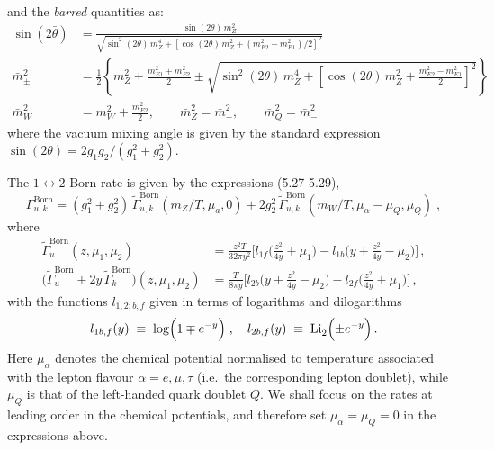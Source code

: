 \documentclass[12pt, a4paper]{article}
\begin{document}
and the \emph{barred} quantities as:
\begin{align}
\sin(2\bar\theta) &= \frac{\sin(2\theta)\, m_Z^2}{\sqrt{\sin^2(2\theta)\, m_Z^4 
  + [\cos(2\theta)\, m_Z^2 + (m_{E2}^2 - m_{E1}^2)/2]^2}} \\
\bar{m}_\pm^2 &= \frac{1}{2}\left\{m_Z^2 + \frac{m_{E1}^2+m_{E2}^2}{2} 
  \pm \sqrt{\sin^2(2\theta)\, m_Z^4 
  + \left[\cos(2\theta)\, m_Z^2 
  + \frac{m_{E2}^2-m_{E1}^2}{2}\right]^2}\right\} \\
\bar{m}_W^2 &= m_W^2 + \frac{m_{E2}^2}{2}, \qquad
\bar{m}_Z^2 = \bar{m}_+^2, \qquad
\bar{m}_Q^2 = \bar{m}_-^2
\end{align}
where the vacuum mixing angle is given by the standard expression
$\sin(2\theta) = 2g_1 g_2/(g_1^2+g_2^2)$.

The $1\leftrightarrow2$ Born rate is given by the expressions (5.27-5.29),
 \begin{equation}
 \Gamma^\mathrm{Born}_{\!u,k}
   =
   (g_1^2 + g_2^2)\,
   \tilde{\Gamma}_{\!u,k}^\mathrm{Born}
   (m_Z/T, \mu_{a}, 0)
   + 
   2 g_2^2\, \tilde{\Gamma}_{\!u,k}^\mathrm{Born}
   (m_W/T, \mu_\alpha - \mu_Q,\mu_Q)
   \;,
 \end{equation}
where
 \begin{align}
 \tilde{\Gamma}^\mathrm{Born}_{\!u}(z,\mu^{ }_1,\mu^{ }_2) 
 &=
 \frac{z^2 T}{32\pi y^2}
 \biggl[
   l_{1f} \biggl( \frac{z^2}{4 y} + \mu^{ }_1 \biggr) 
 - 
 l_{1b} \biggl( y + \frac{z^2}{4y} - \mu^{ }_2 \biggr) 
 \biggr]\,,\\
 \bigl( \tilde{\Gamma}^\mathrm{Born}_{\!u}
 + 2 y\, \tilde{\Gamma}^\mathrm{Born}_{\!k}
 \bigr) (z,\mu^{ }_1,\mu^{ }_2)
 &=
 \frac{T}{8\pi y}
 \biggl[
   l_{2b} \biggl(y+ \frac{z^2}{4 y} - \mu^{ }_2 \biggr) 
 - 
 l_{2f} \biggl( \frac{z^2}{4y} + \mu^{ }_1 \biggr) 
 \biggr]\,,
 \end{align}
with the functions $l_{1,2;b,f}$ given in terms of logarithms and dilogarithms
\begin{align}
  l_{1b,f}(y) \; \equiv \; \log \Bigl( 1 \mp e^{-y} \Bigr)
 \;, \quad
 l_{2b,f}(y) \; \equiv \; \mathrm{Li}^{ }_2 \Bigl(\pm e^{-y}\Bigr)\,.
 \end{align}
 Here $\mu_\alpha$ denotes the chemical potential normalised to temperature associated with the lepton flavour $\alpha=e,\mu,\tau$ (i.e.\ the corresponding lepton doublet), while $\mu_Q$ is that of the left-handed quark doublet $Q$.
We shall focus on the rates at leading order in the chemical potentials, and therefore set $\mu_\alpha=\mu_Q=0$ in the expressions above. 
\end{document}
